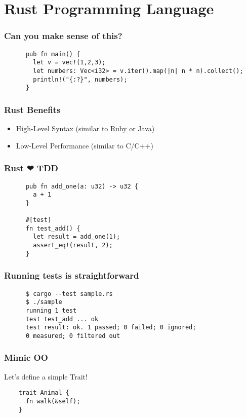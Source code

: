 \section{Rust Programming Language}
\label{sec:rust-language}

\begin{frame}[fragile]
  \frametitle{Can you make sense of this?}
    \begin{verbatim}
      pub fn main() {
        let v = vec!(1,2,3);
        let numbers: Vec<i32> = v.iter().map(|n| n * n).collect();
        println!("{:?}", numbers);
      }
    \end{verbatim}
\end{frame}

\begin{frame}
  \frametitle{Rust Benefits}
  \begin{itemize}
  \item High-Level Syntax (similar to Ruby or Java)
  \item Low-Level Performance (similar to C/C++)
  \end{itemize}
\end{frame}

\begin{frame}[fragile]
  \frametitle{Rust {\DejaSans ❤} TDD}
    \begin{verbatim}
      pub fn add_one(a: u32) -> u32 {
        a + 1
      }

      #[test]
      fn test_add() {
        let result = add_one(1);
        assert_eq!(result, 2);
      }
    \end{verbatim}
\end{frame}

\begin{frame}[fragile]
  \frametitle{Running tests is straightforward}
    \begin{verbatim}
      $ cargo --test sample.rs
      $ ./sample
      running 1 test
      test test_add ... ok
      test result: ok. 1 passed; 0 failed; 0 ignored;
      0 measured; 0 filtered out
    \end{verbatim}
\end{frame}

\begin{frame}[fragile]
  \frametitle{Mimic OO}
  Let's define a simple Trait! \break{}
  \begin{verbatim}
    trait Animal {
      fn walk(&self);
    }
  \end{verbatim}
\end{frame}

